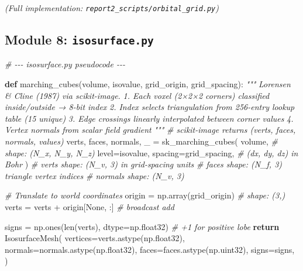 \documentclass[
  11pt,
]{report}
\newenvironment{Shaded}{}{}
\newcommand{\BuiltInTok}[1]{\textcolor[rgb]{0.00,0.50,0.00}{#1}}
\newcommand{\CommentTok}[1]{\textcolor[rgb]{0.38,0.63,0.69}{\textit{#1}}}
\newcommand{\ControlFlowTok}[1]{\textcolor[rgb]{0.00,0.44,0.13}{\textbf{#1}}}
\newcommand{\KeywordTok}[1]{\textcolor[rgb]{0.00,0.44,0.13}{\textbf{#1}}}
\newcommand{\NormalTok}[1]{#1}
\newcommand{\OperatorTok}[1]{\textcolor[rgb]{0.40,0.40,0.40}{#1}}
\newcommand{\VariableTok}[1]{\textcolor[rgb]{0.10,0.09,0.49}{#1}}
\begin{document}
\emph{(Full implementation: \texttt{report2\_scripts/orbital\_grid.py})}

\subsection{\texorpdfstring{Module 8:
\texttt{isosurface.py}}{Module 8: isosurface.py}}\label{module-8-isosurface.py}

\begin{Shaded}
\begin{Highlighting}[]
\CommentTok{\# {-}{-}{-} isosurface.py pseudocode {-}{-}{-}}

\KeywordTok{def}\NormalTok{ marching\_cubes(volume, isovalue, grid\_origin, grid\_spacing):}
    \CommentTok{"""}
\CommentTok{    Lorensen \& Cline (1987) via scikit{-}image.}
\CommentTok{    1. Each voxel (2×2×2 corners) classified inside/outside → 8{-}bit index}
\CommentTok{    2. Index selects triangulation from 256{-}entry lookup table (15 unique)}
\CommentTok{    3. Edge crossings linearly interpolated between corner values}
\CommentTok{    4. Vertex normals from scalar field gradient}
\CommentTok{    """}
    \CommentTok{\# scikit{-}image returns (verts, faces, normals, values)}
\NormalTok{    verts, faces, normals, \_ }\OperatorTok{=}\NormalTok{ sk\_marching\_cubes(}
\NormalTok{        volume,                          }\CommentTok{\# shape: (N\_x, N\_y, N\_z)}
\NormalTok{        level}\OperatorTok{=}\NormalTok{isovalue,}
\NormalTok{        spacing}\OperatorTok{=}\NormalTok{grid\_spacing,            }\CommentTok{\# (dx, dy, dz) in Bohr}
\NormalTok{    )}
    \CommentTok{\# verts shape: (N\_v, 3) in grid{-}spacing units}
    \CommentTok{\# faces shape: (N\_f, 3) triangle vertex indices}
    \CommentTok{\# normals shape: (N\_v, 3)}

    \CommentTok{\# Translate to world coordinates}
\NormalTok{    origin }\OperatorTok{=}\NormalTok{ np.array(grid\_origin)           }\CommentTok{\# shape: (3,)}
\NormalTok{    verts }\OperatorTok{=}\NormalTok{ verts }\OperatorTok{+}\NormalTok{ origin[}\VariableTok{None}\NormalTok{, :]          }\CommentTok{\# broadcast add}

\NormalTok{    signs }\OperatorTok{=}\NormalTok{ np.ones(}\BuiltInTok{len}\NormalTok{(verts), dtype}\OperatorTok{=}\NormalTok{np.float32)  }\CommentTok{\# +1 for positive lobe}
    \ControlFlowTok{return}\NormalTok{ IsosurfaceMesh(}
\NormalTok{        vertices}\OperatorTok{=}\NormalTok{verts.astype(np.float32),}
\NormalTok{        normals}\OperatorTok{=}\NormalTok{normals.astype(np.float32),}
\NormalTok{        faces}\OperatorTok{=}\NormalTok{faces.astype(np.uint32),}
\NormalTok{        signs}\OperatorTok{=}\NormalTok{signs,}
\NormalTok{    )}



\end{Highlighting}
\end{Shaded}
\end{document}

